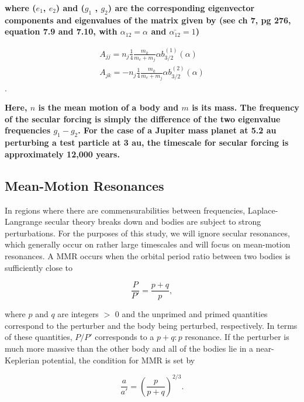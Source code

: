 \documentclass[fleqn,usenatbib]{mnras}
\begin{document}
\noindent \textbf{where  ($e_{1}$, $e_{2}$) and ($g_{1}$ , $g_{2}$) are the corresponding eigenvector components and eigenvalues of the matrix given by \citet{1999ssd..book.....M} (see ch 7, pg 276, equation 7.9 and 7.10, with $\alpha_{12} = \alpha$ and $\bar{\alpha_{12}} = 1$)}

\begin{eqnarray}\label{eq:pert_matrix}
	A_{jj} = n_{j} \frac{1}{4} \frac{m_{k}}{m_{c} + m_{j}} \alpha b_{3/2}^{(1)} (\alpha) \\ \nonumber
	A_{jk} = -n_{j} \frac{1}{4} \frac{m_{k}}{m_{c} + m_{j}} \alpha b_{3/2}^{(2)} (\alpha)
\end{eqnarray}.

\noindent \textbf{Here, $n$ is the mean motion of a body and $m$ is its mass. The frequency of the secular forcing is simply the difference of the two eigenvalue frequencies $g_{1} - g_{2}$. For the case of a Jupiter mass planet at 5.2 au perturbing a test particle at 3 au, the timescale for secular forcing is approximately 12,000 years.}

\subsection{Mean-Motion Resonances}\label{sec:mmr}

In regions where there are commensurabilities between frequencies, Laplace-Langrange secular theory breaks down and bodies are subject to strong 
perturbations. For the purposes of this study, we will ignore secular resonances, which generally occur on rather large timescales and will focus on 
mean-motion resonances. A MMR occurs  when the orbital period ratio between two bodies is sufficiently close to

\begin{equation}\label{eq:per_mmr}
	\frac{P}{P'} = \frac{p + q}{p},
\end{equation}

\noindent where  $p$ and $q$ are integers $>$ 0 and the unprimed and primed quantities correspond to the perturber and the body being perturbed, 
respectively. In terms of these quantities, $P/P'$ corresponds to a $p+q:p$ resonance. If the perturber is much more massive than the other body and all of the 
bodies lie in a near-Keplerian potential, the condition for MMR is set by

\begin{equation}\label{eq:a_mmr}
	\frac{a}{a'} = \left( \frac{p}{p + q} \right)^{2/3}.
\end{equation}
\end{document}
